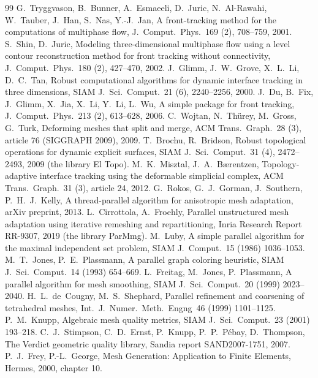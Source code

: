 \documentclass[10pt,a4paper]{article}
\theoremstyle{definition}
\begin{document}
\begin{thebibliography}{99}
 G.~Tryggvason, B.~Bunner, A.~Esmaeeli, D.~Juric,
  N.~Al-Rawahi, W.~Tauber, J.~Han, S.~Nas, Y.-J.~Jan, A front-tracking
  method for the computations of multiphase flow, J.\ Comput.\ Phys.\ 169
  (2), 708--759, 2001.
 S.~Shin, D.~Juric, Modeling three-dimensional multiphase
  flow using a level contour reconstruction method for front tracking
  without connectivity, J.\ Comput.\ Phys.\ 180 (2), 427--470, 2002.
 J.~Glimm, J.~W.~Grove, X.~L.~Li, D.~C.~Tan, Robust
  computational algorithms for dynamic interface tracking in three
  dimensions, SIAM J.\ Sci.\ Comput.\ 21 (6), 2240--2256, 2000.
 J.~Du, B.~Fix, J.~Glimm, X.~Jia, X.~Li, Y.~Li, L.~Wu, A simple
  package for front tracking, J.\ Comput.\ Phys.\ 213 (2), 613--628, 2006.
 C.~Wojtan, N.~Th\"urey, M.~Gross, G.~Turk, Deforming meshes
  that split and merge, ACM Trans.\ Graph.\ 28 (3), article 76
  (SIGGRAPH 2009), 2009.
 T.~Brochu, R.~Bridson, Robust topological operations for
  dynamic explicit surfaces, SIAM J.\ Sci.\ Comput.\ 31 (4), 2472--2493,
  2009 (the library El Topo).
 M.~K.~Misztal, J.~A.~B\ae rentzen, Topology-adaptive
  interface tracking using the deformable simplicial complex, ACM Trans.\
  Graph.\ 31 (3), article 24, 2012.
 G.~Rokos, G.~J.~Gorman, J.~Southern, P.~H.~J.~Kelly, A
  thread-parallel algorithm for anisotropic mesh adaptation, arXiv
  preprint, 2013.
 L.~Cirrottola, A.~Froehly, Parallel unstructured mesh
  adaptation using iterative remeshing and repartitioning, Inria Research
  Report RR-9307, 2019 (the library ParMmg).
 M.~Luby, A simple parallel algorithm for the maximal
  independent set problem, SIAM J.\ Comput.\ 15 (1986) 1036--1053.
\bibitem{jones} M.~T.~Jones, P.~E.~Plassmann, A parallel graph coloring
  heuristic, SIAM J.\ Sci.\ Comput.\ 14 (1993) 654--669.
 L.~Freitag, M.~Jones, P.~Plassmann, A parallel
  algorithm for mesh smoothing, SIAM J.\ Sci.\ Comput.\ 20 (1999)
  2023--2040.
 H.~L.~de~Cougny, M.~S.~Shephard, Parallel refinement
  and coarsening of tetrahedral meshes, Int.\ J.\ Numer.\ Meth.\ Engng\ 46
  (1999) 1101--1125.
 P.~M.~Knupp, Algebraic mesh quality metrics, SIAM J.\
  Sci.\ Comput.\ 23 (2001) 193--218.
\bibitem{verdict} C.~J.~Stimpson, C.~D.~Ernst, P.~Knupp, P.~P.~P\'ebay,
  D.~Thompson, The Verdict geometric quality library, Sandia report
  SAND2007-1751, 2007.
\bibitem{freygeorge} P.~J.~Frey, P.-L.~George, Mesh Generation:
  Application to Finite Elements, Hermes, 2000, chapter 10.

\end{thebibliography}
\end{document}
